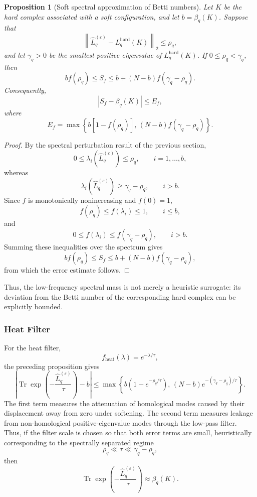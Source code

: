 \documentclass[pdflatex,sn-mathphys-num]{sn-jnl}%
\theoremstyle{thmstyleone}%
\newtheorem{proposition}[theorem]{Proposition}%
\theoremstyle{thmstyletwo}%
\theoremstyle{thmstylethree}%
\begin{document}
\begin{proposition}[Soft spectral approximation of Betti numbers]
Let \(K\) be the hard complex associated with a soft configuration, and let
$b=\beta_q(K)$.
Suppose that
\[
\left\|
\widehat L_q^{(\varepsilon)}
-
L_q^{\mathrm{hard}}(K)
\right\|_2
\le
\rho_q,
\]
and let $\gamma_q>0$
be the smallest positive eigenvalue of
\(L_q^{\mathrm{hard}}(K)\).
If $0\le\rho_q<\gamma_q$,
then
\[
b f(\rho_q)
\le
S_f
\le
b+(N-b)f(\gamma_q-\rho_q).
\]
Consequently,
\[
\left|
S_f-\beta_q(K)
\right|
\le
E_f,
\]
where
\[
E_f
=
\max
\left\{
b\left[1-f(\rho_q)\right],
\,
(N-b)f(\gamma_q-\rho_q)
\right\}.
\]
\end{proposition}

\begin{proof}
By the spectral perturbation result of the previous section,
\[
0
\le
\lambda_i
\left(
\widehat L_q^{(\varepsilon)}
\right)
\le
\rho_q,
\qquad
i=1,\ldots,b,
\]
whereas
\[
\lambda_i
\left(
\widehat L_q^{(\varepsilon)}
\right)
\ge
\gamma_q-\rho_q,
\qquad
i>b.
\]
Since \(f\) is monotonically nonincreasing and \(f(0)=1\),
\[
f(\rho_q)
\le
f(\lambda_i)
\le
1,
\qquad
i\le b,
\]
and
\[
0
\le
f(\lambda_i)
\le
f(\gamma_q-\rho_q),
\qquad
i>b.
\]
Summing these inequalities over the spectrum gives
\[
b f(\rho_q)
\le
S_f
\le
b+(N-b)f(\gamma_q-\rho_q),
\]
from which the error estimate follows.
\end{proof}

Thus, the low-frequency spectral mass is not merely a heuristic surrogate: its deviation from the Betti number of the corresponding hard complex can be explicitly bounded.


\subsubsection{Heat Filter}

For the heat filter,
\[
f_{\mathrm{heat}}(\lambda)
=
e^{-\lambda/\tau},
\]
the preceding proposition gives
\[
\left|
\operatorname{Tr}
\exp\left(
-\frac{\widehat L_q^{(\varepsilon)}}{\tau}
\right)
-
b
\right|
\le
\max
\left\{
b\left(1-e^{-\rho_q/\tau}\right),
\,
(N-b)e^{-(\gamma_q-\rho_q)/\tau}
\right\}.
\]
The first term measures the attenuation of homological modes caused by their displacement away from zero under softening. The second term measures leakage from non-homological positive-eigenvalue modes through the low-pass filter.
Thus, if the filter scale is chosen so that both error terms are small, heuristically corresponding to the spectrally separated regime
\[
\rho_q
\ll
\tau
\ll
\gamma_q-\rho_q,
\]
then
\[
\operatorname{Tr}
\exp\left(
-\frac{\widehat L_q^{(\varepsilon)}}{\tau}
\right)
\approx
\beta_q(K).
\]
\end{document}
